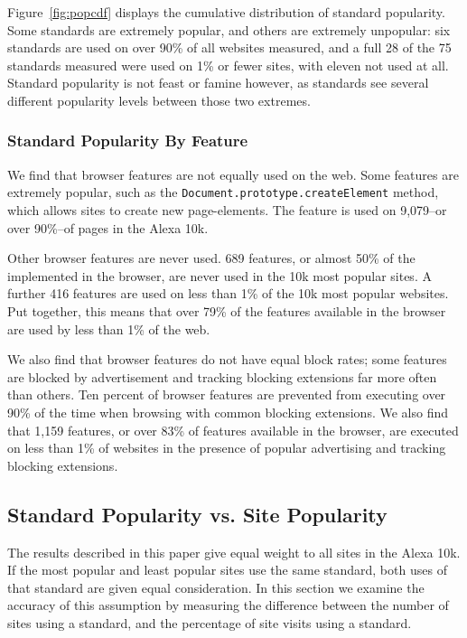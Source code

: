 Figure~\ref{fig:popcdf} displays the cumulative distribution of standard
popularity. Some standards are extremely popular, and others are extremely
unpopular: six standards are used on over 90\% of all websites measured, and a
full 28 of the 75 standards measured were used on 1\% or fewer sites, with
eleven not used at all. Standard popularity is not feast or famine however, as
standards see several different popularity levels between those two extremes.


\subsubsection{Standard Popularity By Feature} We find that browser features
are not equally used on the web.  Some features are extremely popular, such as
the \texttt{Document.prototype.createElement} method, which allows sites to
create new page-elements.  The feature is used on 9,079--or over 90\%--of pages
in the Alexa 10k.

Other browser features are never used.  689 features, or almost 50\% of the
\numfeatures implemented in the browser, are never used in the 10k most popular
sites.  A further 416 features are used on less than 1\% of the 10k most
popular websites.  Put together, this means that over 79\% of the features
available in the browser are used by less than 1\% of the web.

We also find that browser features do not have equal block rates; some features
are blocked by advertisement and tracking blocking extensions far more often
than others.  Ten percent of browser features are prevented from executing over
90\% of the time when browsing with common blocking extensions.   We also find
that 1,159 features, or over 83\% of features available in the browser, are
executed on less than 1\% of websites in the presence of popular advertising
and tracking blocking extensions.


\subsection{Standard Popularity vs. Site Popularity}
\label{sec:results-feat-pop-by-site-pop}



The results described in this paper give equal weight to all sites in the Alexa
10k.  If the most popular and least popular sites use the same standard, both
uses of that standard are given equal consideration.  In this section we
examine the accuracy of this assumption by measuring the difference between the
number of sites using a standard, and the percentage of site visits using a
standard.


